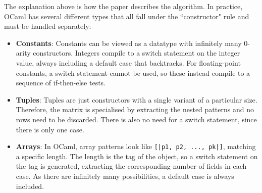 The explanation above is how the paper describes the algorithm. In practice, OCaml has several different types that all fall under the ``constructor" rule and must be handled separately:
\begin{itemize}
\item \textbf{Constants}: Constants can be viewed as a datatype with infinitely many 0-arity constructors. Integers compile to a switch statement on the integer value, always including a default case that backtracks. For floating-point constants, a switch statement cannot be used, so these instead compile to a sequence of if-then-else tests.

\item \textbf{Tuples}: Tuples are just constructors with a single variant of a particular size. Therefore, the matrix is specialised by extracting the nested patterns and no rows need to be discarded. There is also no need for a switch statement, since there is only one case.

\item \textbf{Arrays}: In OCaml, array patterns look like \verb"[|p1, p2, ..., pk|]", matching a specific length. 
The length is the tag of the object, so a switch statement on the tag is generated, extracting the corresponding number of fields in each case. As there are infinitely many possibilities, a default case is always included.


\end{itemize}
